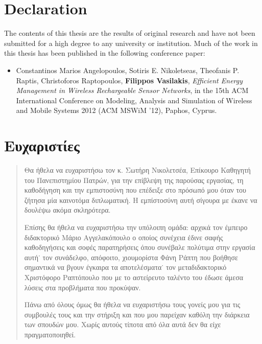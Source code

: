\frontmatter
\chapter{Declaration}
The contents of this thesis are the results of original research and have not been submitted for a high degree to any university or institution. Much of the work in
this thesis has been published in the following conference paper:
\begin{itemize}
\item Constantinos Marios Angelopoulos, Sotiris E. Nikoletseas, Theofanis P. Raptis, Christoforos Raptopoulos, \textbf{Filippos Vasilakis}, \textit{Efficient Energy
Management in Wireless Rechargeable Sensor Networks}, in the 15th ACM International Conference on Modeling, Analysis and Simulation of Wireless and Mobile
Systems 2012 (ACM MSWiM ’12), Paphos, Cyprus.
\end{itemize}
\chapter{Ευχαριστίες}
\begin{abstract}
Θα ήθελα να ευχαριστήσω τον κ. Σωτήρη Νικολετσέα, Επίκουρο Καθηγητή του Πανεπιστημίου Πατρών, για την επίβλεψη της παρούσας εργασίας, τη καθοδήγηση και την
εμπιστοσύνη που επέδειξε στο πρόσωπό μου όταν του ζήτησα μία καινοτόμα διπλωματική. Η εμπίστοσύνη αυτή σίγουρα με έκανε να δουλέψω ακόμα σκληρότερα.

Επίσης θα ήθελα να ευχαριστήσω την υπόλοιπη ομάδα: αρχικά τον έμπειρο διδακτορικό Μάριο Αγγελακόπουλο ο οποίος συνέχεια έδινε σαφής καθοδηγήσεις και σοφές
παρατηρήσεις όπου συνέβαλε πολύτιμα στην εργασία αυτή˙ τον συνάδελφο, απόφοιτο, χιουμορίστα Φάνη Ράπτη που βοήθησε σημαντικά να βγουν έγκαιρα τα
αποτελέσματα˙ τον μεταδιδακτορικό Χριστόφορο Ραπτόπουλο που με το αστείρευτο ταλέντο του έδωσε άμεσα λύσεις στα προβλήματα που προκύψαν.

Πάνω από όλους όμως θα ήθελα να ευχαριστήσω τους γονείς μου για τις συμβουλές τους και την στήριξη και που μου παρείχαν καθόλη την
διάρκεια των σπουδών μου. Χωρίς αυτούς τίποτα από όλα αυτά δεν θα είχε πραγματοποιηθεί.

\end{abstract}
\vspace{-10pt}
